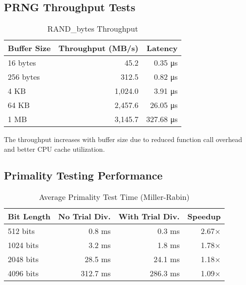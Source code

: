 \subsection{PRNG Throughput Tests}

\begin{table}[ht]
    \centering
    \caption{RAND\_bytes Throughput}
    \begin{tabular}{|l|r|r|}
        \hline
        \textbf{Buffer Size} & \textbf{Throughput (MB/s)} & \textbf{Latency} \\
        \hline
        16 bytes             & 45.2                       & 0.35 μs          \\
        256 bytes            & 312.5                      & 0.82 μs          \\
        4 KB                 & 1,024.0                    & 3.91 μs          \\
        64 KB                & 2,457.6                    & 26.05 μs         \\
        1 MB                 & 3,145.7                    & 327.68 μs        \\
        \hline
    \end{tabular}
\end{table}

The throughput increases with buffer size due to reduced function call overhead and better CPU cache utilization.

\subsection{Primality Testing Performance}

\begin{table}[ht]
    \centering
    \caption{Average Primality Test Time (Miller-Rabin)}
    \begin{tabular}{|l|r|r|r|}
        \hline
        \textbf{Bit Length} & \textbf{No Trial Div.} & \textbf{With Trial Div.} & \textbf{Speedup} \\
        \hline
        512 bits            & 0.8 ms                 & 0.3 ms                   & 2.67×            \\
        1024 bits           & 3.2 ms                 & 1.8 ms                   & 1.78×            \\
        2048 bits           & 28.5 ms                & 24.1 ms                  & 1.18×            \\
        4096 bits           & 312.7 ms               & 286.3 ms                 & 1.09×            \\
        \hline
    \end{tabular}
\end{table}

